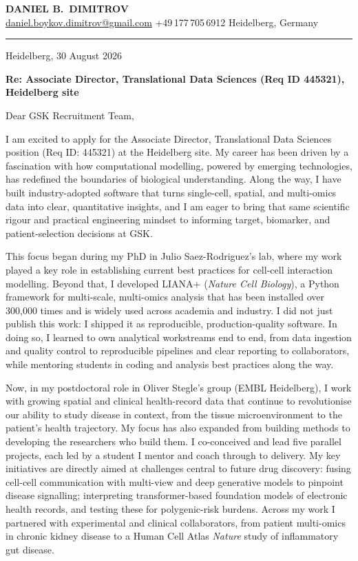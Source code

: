\documentclass[11pt,a4paper]{article}
\newcommand{\sep}{\;{\color{accent}\rule[-0.15ex]{0.6pt}{1.55ex}}\;}
\begin{document}
{\huge\bfseries\color{accent}DANIEL B.\ DIMITROV}\\[3pt]
{\small
\faEnvelope\; \href{mailto:daniel.boykov.dimitrov@gmail.com}{daniel.boykov.dimitrov@gmail.com}\sep
\faPhone*\; +49\,177\,705\,6912\sep
\faMapMarker*\; Heidelberg, Germany}\\[2pt]
{\color{accent}\rule{\linewidth}{0.6pt}}

\vspace{6pt}
\hfill{\color{softgrey}Heidelberg, 30 August 2026}

\textbf{Re: Associate Director, Translational Data Sciences (Req ID 445321), Heidelberg site}

Dear GSK Recruitment Team,

I am excited to apply for the Associate Director, Translational Data Sciences position (Req ID: 445321) at the Heidelberg site. My career has been driven by a fascination with how computational modelling, powered by emerging technologies, has redefined the boundaries of biological understanding. Along the way, I have built industry-adopted software that turns single-cell, spatial, and multi-omics data into clear, quantitative insights, and I am eager to bring that same scientific rigour and practical engineering mindset to informing target, biomarker, and patient-selection decisions at GSK.

This focus began during my PhD in Julio Saez-Rodriguez's lab, where my work played a key role in establishing current best practices for cell-cell interaction modelling. Beyond that, I developed LIANA+ (\textit{Nature Cell Biology}), a Python framework for multi-scale, multi-omics analysis that has been installed over 300,000 times and is widely used across academia and industry. I did not just publish this work: I shipped it as reproducible, production-quality software. In doing so, I learned to own analytical workstreams end to end, from data ingestion and quality control to reproducible pipelines and clear reporting to collaborators, while mentoring students in coding and analysis best practices along the way.

Now, in my postdoctoral role in Oliver Stegle's group (EMBL Heidelberg), I work with growing spatial and clinical health-record data that continue to revolutionise our ability to study disease in context, from the tissue microenvironment to the patient's health trajectory. My focus has also expanded from building methods to developing the researchers who build them. I co-conceived and lead five parallel projects, each led by a student I mentor and coach through to delivery. My key initiatives are directly aimed at challenges central to future drug discovery: fusing cell-cell communication with multi-view and deep generative models to pinpoint disease signalling; interpreting transformer-based foundation models of electronic health records, and testing these for polygenic-risk burdens. Across my work I partnered with experimental and clinical collaborators, from patient multi-omics in chronic kidney disease to a Human Cell Atlas \textit{Nature} study of inflammatory gut disease.
\end{document}
